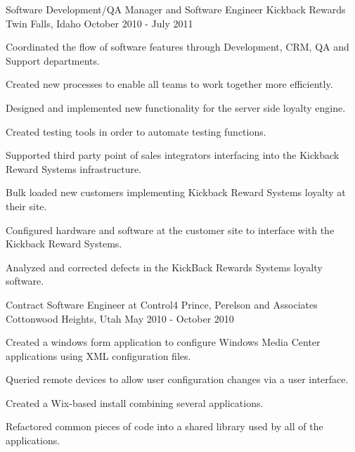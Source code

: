 \cventry
{Software Development/QA Manager and Software Engineer} %
{Kickback Rewards} %
{Twin Falls, Idaho} %
{October 2010 - July 2011} %
{
	\begin{cvitems} %
		\item {Coordinated the flow of software features through Development, CRM, QA and Support departments.}
		\item {Created new processes to enable all teams to work together more efficiently.}
		\item {Designed and implemented new functionality for the server side loyalty engine.}
		\item {Created testing tools in order to automate testing functions.}
		\item {Supported third party point of sales integrators interfacing into the Kickback Reward Systems infrastructure.}
		\item {Bulk loaded new customers implementing Kickback Reward Systems loyalty at their site.}
		\item {Configured hardware and software at the customer site to interface with the Kickback Reward Systems.}
		\item {Analyzed and corrected defects in the KickBack Rewards Systems loyalty software.}
	\end{cvitems}
}

\cventry
{Contract Software Engineer at Control4} %
{Prince, Perelson and Associates} %
{Cottonwood Heights, Utah} %
{May 2010 - October 2010} %
{
	\begin{cvitems} %
		\item {Created a windows \Csh{} form application to configure Windows Media Center applications using XML configuration files.}
		\item {Queried remote devices to allow user configuration changes via a user interface.}
		\item {Created a Wix-based install combining several applications.}
		\item {Refactored common pieces of code into a shared library used by all of the applications.}
	\end{cvitems}
}

